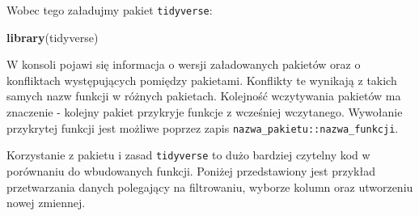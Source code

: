 \documentclass[]{book}
\newenvironment{Shaded}{\begin{snugshade}}{\end{snugshade}}
\newcommand{\KeywordTok}[1]{\textcolor[rgb]{0.13,0.29,0.53}{\textbf{#1}}}
\newcommand{\DataTypeTok}[1]{\textcolor[rgb]{0.13,0.29,0.53}{#1}}
\newcommand{\DecValTok}[1]{\textcolor[rgb]{0.00,0.00,0.81}{#1}}
\newcommand{\StringTok}[1]{\textcolor[rgb]{0.31,0.60,0.02}{#1}}
\newcommand{\CommentTok}[1]{\textcolor[rgb]{0.56,0.35,0.01}{\textit{#1}}}
\newcommand{\OperatorTok}[1]{\textcolor[rgb]{0.81,0.36,0.00}{\textbf{#1}}}
\newcommand{\NormalTok}[1]{#1}
\begin{document}
Wobec tego załadujmy pakiet \texttt{tidyverse}:

\begin{Shaded}
\begin{Highlighting}[]
\KeywordTok{library}\NormalTok{(tidyverse)}
\end{Highlighting}
\end{Shaded}

W konsoli pojawi się informacja o wersji załadowanych pakietów oraz o
konfliktach występujących pomiędzy pakietami. Konflikty te wynikają z
takich samych nazw funkcji w różnych pakietach. Kolejność wczytywania
pakietów ma znaczenie - kolejny pakiet przykryje funkcje z wcześniej
wczytanego. Wywołanie przykrytej funkcji jest możliwe poprzez zapis
\texttt{nazwa\_pakietu::nazwa\_funkcji}.

Korzystanie z pakietu i zasad \texttt{tidyverse} to dużo bardziej
czytelny kod w porównaniu do wbudowanych funkcji. Poniżej przedstawiony
jest przykład przetwarzania danych polegający na filtrowaniu, wyborze
kolumn oraz utworzeniu nowej zmiennej.

\begin{Shaded}
\end{Shaded}
\end{document}
